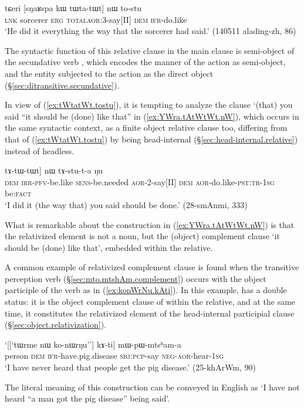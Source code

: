 \begin{exe}
\ex \label{ex:tWtatWt.tostu}
\gll tɕeri [sŋaʁspa kɯ tɯ\redp{}ta-tɯt] nɯ to-stu \\
\textsc{lnk} sorcerer \textsc{erg} \textsc{total}\redp{}\textsc{aor}:3\flobv{}-say[II] \textsc{dem} \textsc{ifr}-do.like \\
\glt `He did it everything the way that the sorcerer had said.' (140511 alading-zh, 86)
\end{exe} 

The syntactic function of this relative clause in the main clause is semi-object of the secundative verb , which encodes the manner of the action as semi-object, and the entity subjected to the action as the direct object  (§\ref{sec:ditransitive.secundative}). 

In view of (\ref{ex:tWtatWt.tostu}), it is tempting to analyze the clause  `(that) you said ``it should be (done) like that'' in (\ref{ex:YWra.tAtWtWt.nW}), which occurs in the same syntactic context, as a finite object relative clause too, differing from that of (\ref{ex:tWtatWt.tostu}) by being head-internal (§\ref{sec:head-internal.relative}) instead of headless.

\begin{exe}
\ex \label{ex:YWra.tAtWtWt.nW}
\gll [[``\textbf{nɯ} \textbf{a-tɤ-fse} \textbf{ɲɯ-ra}"] tɤ-tɯ-tɯt] nɯ tɤ-stu-t-a ŋu \\
\textsc{dem} \textsc{irr}-\textsc{pfv}-be.like \textsc{sens}-be.needed \textsc{aor}-2-say[II] \textsc{dem} \textsc{aor}-do.like-\textsc{pst}:\textsc{tr}-\textsc{1sg} be:\textsc{fact} \\
\glt `I did it (the way that) you said should be done.' (28-smAnmi, 333)
\end{exe} 

What is remarkable about the construction in (\ref{ex:YWra.tAtWtWt.nW}) is that the relativized element is not a noun, but the (object) complement clause  `it should be (done) like that', embedded within the relative. 

A common example of relativized complement clause is found when the transitive perception verb  (§\ref{sec:mto.mtshAm.complement}) occurs with the object participle  of the verb  as in (\ref{ex:konWrNu.kAti}). In this example,  has a double status: it is the object complement clause of  within the relative, and at the same time, it constitutes the relativized element of the head-internal participial clause (§\ref{sec:object.relativization}). 

\begin{exe}
\ex \label{ex:konWrNu.kAti}
\gll `[[`tɯrme nɯ ko-nɯrŋu''] kɤ-ti] mɯ-pɯ-mtsʰam-a \\
person \textsc{dem} \textsc{ifr}-have.pig.disease \textsc{sbj}:\textsc{pcp}-say \textsc{neg}-\textsc{aor}-hear-\textsc{1sg} \\
\glt `I have never heard that people get the pig disease.' (25-khArWm, 90)
\end{exe} 

The literal meaning of this construction can be conveyed in English as `I have not heard ``a man got the pig disease'' being said'.
